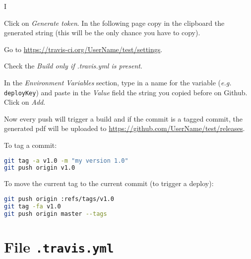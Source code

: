 I\documentclass[12pt]{article}
\begin{document}
Click on \emph{Generate token}. In the following page copy in the clipboard the generated string (this will be the only chance you have to copy).

Go to \url{https://travis-ci.org/UserName/test/settings}. 

Check the \emph{Build only if .travis.yml is present}.

In the \emph{Environment Variables} section, type in a name for the variable (\emph{e.g.} \texttt{deployKey}) and paste in the \emph{Value} field the string you copied before on Github. Click on \emph{Add}.

Now every push will trigger a build and if the commit is a tagged commit, the generated pdf will be uploaded to \url{https://github.com/UserName/test/releases}.

To tag a commit:
\begin{lstlisting}[language=Bash] 
git tag -a v1.0 -m "my version 1.0"
git push origin v1.0
\end{lstlisting}

To move the current tag to the current commit (to trigger a deploy):
\begin{lstlisting}[language=Bash] 
git push origin :refs/tags/v1.0
git tag -fa v1.0
git push origin master --tags
\end{lstlisting}

\section*{File \texttt{.travis.yml}}


\end{document}
